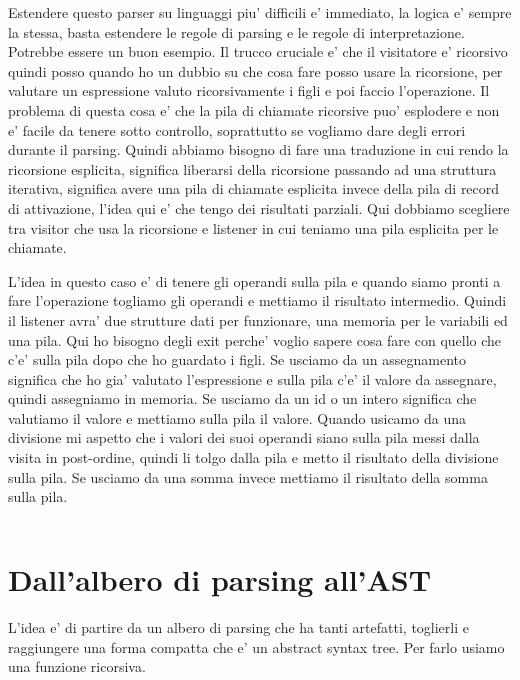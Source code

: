 Estendere questo parser su linguaggi piu' difficili e' immediato, la logica e' sempre la stessa, basta estendere le regole di parsing e le regole di interpretazione. Potrebbe essere un buon esempio. Il trucco cruciale e' che il visitatore e' ricorsivo quindi posso quando ho un dubbio su che cosa fare posso usare la ricorsione, per valutare un espressione valuto ricorsivamente i figli e poi faccio l'operazione.
Il problema di questa cosa e' che la pila di chiamate ricorsive puo' esplodere e non e' facile da tenere sotto controllo, soprattutto se vogliamo dare degli errori durante il parsing. Quindi abbiamo bisogno di fare una traduzione in cui rendo la ricorsione esplicita, significa liberarsi della ricorsione passando ad una struttura iterativa, significa avere una pila di chiamate esplicita invece della pila di record di attivazione, l'idea qui e' che tengo dei risultati parziali. Qui dobbiamo scegliere tra visitor che usa la ricorsione e listener in cui teniamo una pila esplicita per le chiamate.

L'idea in questo caso e' di tenere gli operandi sulla pila e quando siamo pronti a fare l'operazione togliamo gli operandi e mettiamo il risultato intermedio.
Quindi il listener avra' due strutture dati per funzionare, una memoria per le variabili ed una pila. Qui ho bisogno degli exit perche' voglio sapere cosa fare con quello che c'e' sulla pila dopo che ho guardato i figli. Se usciamo da un assegnamento significa che ho gia' valutato l'espressione e sulla pila c'e' il valore da assegnare, quindi assegniamo in memoria. Se usciamo da un id o un intero significa che valutiamo il valore e mettiamo sulla pila il valore. Quando usicamo da una divisione mi aspetto che i valori dei suoi operandi siano sulla pila messi dalla visita in post-ordine, quindi li tolgo dalla pila e metto il risultato della divisione sulla pila. Se usciamo da una somma invece mettiamo il risultato della somma sulla pila.

\begin{lstlisting}

\end{lstlisting}

\section{Dall'albero di parsing all'AST}
L'idea e' di partire da un albero di parsing che ha tanti artefatti, toglierli e raggiungere una forma compatta che e' un abstract syntax tree. Per farlo usiamo una funzione ricorsiva.

